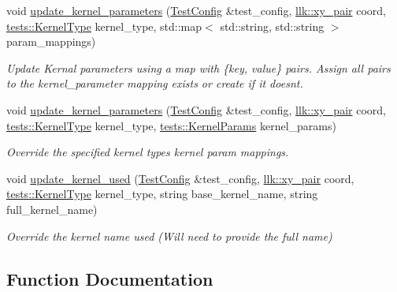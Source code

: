 \begin{DoxyCompactItemize}
void \hyperlink{namespacetests_1_1test__config__api_aaedc4b39408b717d3868dbb7387bdc48}{update\+\_\+kernel\+\_\+parameters} (\hyperlink{structtests_1_1TestConfig}{Test\+Config} \&test\+\_\+config, \hyperlink{structllk_1_1xy__pair}{llk\+::xy\+\_\+pair} coord, \hyperlink{namespacetests_a4f360b8af533762256ff97513bfd6a0d}{tests\+::\+Kernel\+Type} kernel\+\_\+type, std\+::map$<$ std\+::string, std\+::string $>$ param\+\_\+mappings)
\begin{DoxyCompactList}\small\item\em Update Kernal parameters using a map with \{key, value\} pairs. Assign all pairs to the kernel\+\_\+parameter mapping exists or create if it doesn\textquotesingle{}t. \end{DoxyCompactList}\item 
void \hyperlink{namespacetests_1_1test__config__api_a7c5f36113ab125d7740af42d52f9939c}{update\+\_\+kernel\+\_\+parameters} (\hyperlink{structtests_1_1TestConfig}{Test\+Config} \&test\+\_\+config, \hyperlink{structllk_1_1xy__pair}{llk\+::xy\+\_\+pair} coord, \hyperlink{namespacetests_a4f360b8af533762256ff97513bfd6a0d}{tests\+::\+Kernel\+Type} kernel\+\_\+type, \hyperlink{structtests_1_1KernelParams}{tests\+::\+Kernel\+Params} kernel\+\_\+params)
\begin{DoxyCompactList}\small\item\em Override the specified kernel type\textquotesingle{}s kernel param mappings. \end{DoxyCompactList}\item 
void \hyperlink{namespacetests_1_1test__config__api_af3c341ace6617f546990ef3f49e55a24}{update\+\_\+kernel\+\_\+used} (\hyperlink{structtests_1_1TestConfig}{Test\+Config} \&test\+\_\+config, \hyperlink{structllk_1_1xy__pair}{llk\+::xy\+\_\+pair} coord, \hyperlink{namespacetests_a4f360b8af533762256ff97513bfd6a0d}{tests\+::\+Kernel\+Type} kernel\+\_\+type, string base\+\_\+kernel\+\_\+name, string full\+\_\+kernel\+\_\+name)
\begin{DoxyCompactList}\small\item\em Override the kernel name used (Will need to provide the full name) \end{DoxyCompactList}\end{DoxyCompactItemize}


\subsection{Function Documentation}
\mbox{\label{namespacetests_1_1test__config__api_acb29a0a49bb5ecb9cd6ca09eb6211ad1}} 
